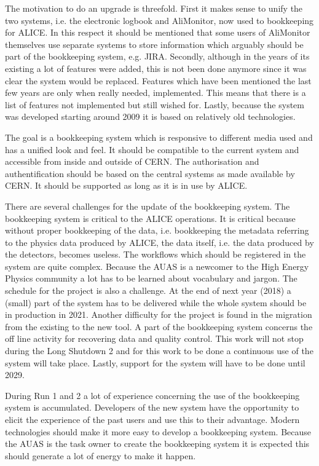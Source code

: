 The motivation to do an upgrade is threefold. First it makes sense to unify the two systems, i.e. the electronic logbook and AliMonitor, now used to bookkeeping for ALICE. In this respect it should be mentioned that some users of AliMonitor themselves use separate systems to store information which arguably should be part of the bookkeeping system, e.g. JIRA. Secondly, although in the years of its existing a lot of features were added, this is not been done anymore since it was clear the system would be replaced. Features which have been mentioned the last few years are only when really needed, implemented. This means that there is a list of features not implemented but still wished for. Lastly, because the system was developed starting around 2009 it is based on relatively old technologies. 

The goal is a bookkeeping system which is responsive to different media used and has a unified look and feel. It should be compatible to the current system and accessible from inside and outside of CERN. The authorisation and authentification should be based on the central systems as made available by CERN. It should be supported as long as it is in use by ALICE.

There are several challenges for the update of the bookkeeping system. The bookkeeping system is critical to the ALICE operations. It is critical because without proper bookkeeping of the data, i.e. bookkeeping the metadata referring to the physics data produced by ALICE, the data itself, i.e. the data produced by the detectors, becomes useless. The workflows which should be registered in the system are quite complex. Because the AUAS is a newcomer to the High Energy Physics community a lot has to be learned about vocabulary and jargon. The schedule for the project is also a challenge. At the end of next year (2018) a (small) part of the system has to be delivered while the whole system should be in production in 2021. Another difficulty for the project is found in the migration from the existing to the new tool. A part of the bookkeeping system concerns the off line activity for recovering data and quality control. This work will not stop during the Long Shutdown 2 and for this work to be done a continuous use of the system will take place. Lastly, support for the system will have to be done until 2029.

During Run 1 and 2 a lot of experience concerning the use of the bookkeeping system is accumulated. Developers of the new system have the opportunity to elicit the experience of the past users and use this to their advantage. Modern technologies should make it more easy to develop a bookkeeping system. Because the AUAS is the task owner to create the bookkeeping system it is expected this should generate a lot of energy to make it happen.

